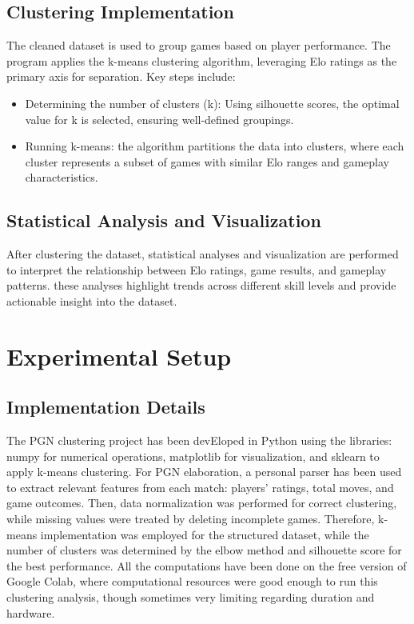 \documentclass[conference]{IEEEtran}
\begin{document}
\subsection{Clustering Implementation}
 The cleaned dataset is used to group games based on player performance. The program applies the k-means clustering algorithm, leveraging Elo ratings as the primary axis for separation. Key steps include:
\begin{itemize}
    \item Determining the number of clusters (k): Using silhouette scores, the optimal value for k is selected, ensuring well-defined groupings.
    \item Running k-means: the algorithm partitions the data into clusters, where each cluster represents a subset of games with similar Elo ranges and gameplay characteristics.
\end{itemize}

\subsection{Statistical Analysis and Visualization}
After clustering the dataset, statistical analyses and visualization are performed to interpret the relationship between Elo ratings, game results, and gameplay patterns. these analyses highlight trends across different skill levels and provide actionable insight into the dataset.

\section{Experimental Setup}

\subsection{Implementation Details}
The PGN clustering project has been devEloped in Python using the libraries: numpy for numerical operations, matplotlib for visualization, and sklearn to apply k-means clustering. For PGN elaboration, a personal parser has been used to extract relevant features from each match: players' ratings, total moves, and game outcomes. Then, data normalization was performed for correct clustering, while missing values were treated by deleting incomplete games. Therefore, k-means implementation was employed for the structured dataset, while the number of clusters was determined by the elbow method and silhouette score for the best performance. All the computations have been done on the free version of Google Colab, where computational resources were good enough to run this clustering analysis, though sometimes very limiting regarding duration and hardware.
\end{document}
